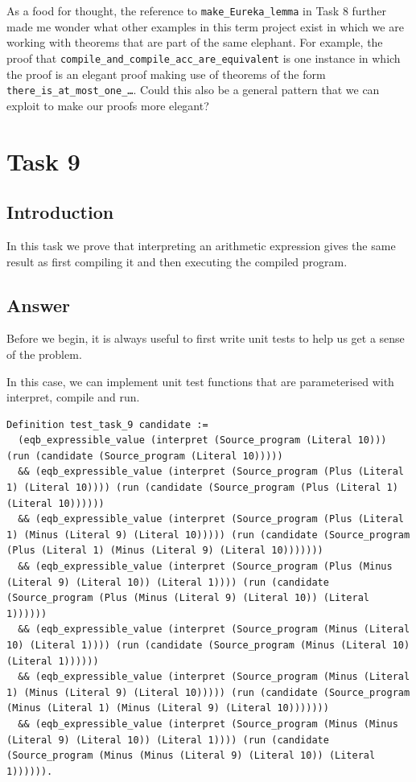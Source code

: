\documentclass{article}
\begin{document}
As a food for thought, the reference to \texttt{make\_Eureka\_lemma} in Task 8 further made me wonder what other examples in this term project exist in which we are working with theorems that are part of the same elephant. For example, the proof that \texttt{compile\_and\_compile\_acc\_are\_equivalent} is one instance in which the proof is an elegant proof making use of theorems of the form \texttt{there\_is\_at\_most\_one\_\ldots}. Could this also be a general pattern that we can exploit to make our proofs more elegant?


\section{Task 9}
\subsection{Introduction}
In this task we prove that interpreting an arithmetic expression gives the same result as first compiling it and then executing the compiled program.

\subsection{Answer}
Before we begin, it is always useful to first write unit tests to help us get a sense of the problem.

In this case, we can implement unit test functions that are parameterised with interpret, compile and run.

\begin{lstlisting}
Definition test_task_9 candidate :=
  (eqb_expressible_value (interpret (Source_program (Literal 10))) (run (candidate (Source_program (Literal 10)))))
  && (eqb_expressible_value (interpret (Source_program (Plus (Literal 1) (Literal 10)))) (run (candidate (Source_program (Plus (Literal 1) (Literal 10))))))
  && (eqb_expressible_value (interpret (Source_program (Plus (Literal 1) (Minus (Literal 9) (Literal 10))))) (run (candidate (Source_program (Plus (Literal 1) (Minus (Literal 9) (Literal 10)))))))
  && (eqb_expressible_value (interpret (Source_program (Plus (Minus (Literal 9) (Literal 10)) (Literal 1)))) (run (candidate (Source_program (Plus (Minus (Literal 9) (Literal 10)) (Literal 1))))))
  && (eqb_expressible_value (interpret (Source_program (Minus (Literal 10) (Literal 1)))) (run (candidate (Source_program (Minus (Literal 10) (Literal 1))))))
  && (eqb_expressible_value (interpret (Source_program (Minus (Literal 1) (Minus (Literal 9) (Literal 10))))) (run (candidate (Source_program (Minus (Literal 1) (Minus (Literal 9) (Literal 10)))))))
  && (eqb_expressible_value (interpret (Source_program (Minus (Minus (Literal 9) (Literal 10)) (Literal 1)))) (run (candidate (Source_program (Minus (Minus (Literal 9) (Literal 10)) (Literal 1)))))).
\end{lstlisting}
\end{document}
